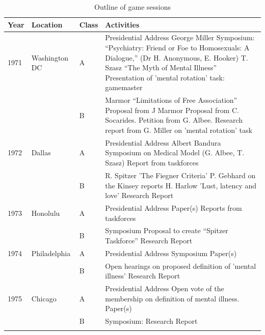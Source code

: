  \begin{longtable}[!t]{ | p{1cm} | p{2cm} | p{1cm} |  p{10cm} | }
\hline

\textbf{Year}&\textbf{Location}&\textbf{Class}&\textbf{Activities} \\ \hline
1971&Washington DC&A&Presidential Address\: George Miller \newline
Symposium: “Psychiatry: Friend or Foe to Homosexuals: A Dialogue,” (Dr H. Anonymous, E. Hooker)\newline
T. Szasz “The Myth of Mental Illness”\newline
Presentation of 'mental rotation' task: gamemaster\\

&&B&

Marmor “Limitations of Free Association”\newline
Proposal from J Marmor\newline
Proposal from C. Socarides.\newline
Petition from G. Albee.\newline
Research report from G. Miller on 'mental rotation' task\\
1972&Dallas&A&Presidential Address\: Albert Bandura\newline
Symposium on Medical Model (G. Albee, T. Szasz)\newline
Report from taskforces\\
&&B&
R. Spitzer 'The Fiegner Criteria'\newline
P. Gebhard on the Kinsey reports\newline
H. Harlow 'Lust, latency and love'\newline
Research Report\\
1973&Honolulu&A&
Presidential Address\: \newline
Paper(s) \newline
Reports from taskforces\\
&&B&
Symposium\:\newline
Proposal to create “Spitzer Taskforce”\newline
Research Report\\
1974&Philadelphia&A
&Presidential Address\:\newline
Symposium\:\newline
Paper(s)\\
&&B&
Open hearings on proposed definition of 'mental illness'\newline
Research Report\\
1975&Chicago&A&
Presidential Address\:\newline
Open vote of the membership on definition of mental illness.\newline
Paper(s)\\
&&B&
Symposium:\newline
Research Report\\
\hline

\caption{Outline of game sessions}
\label{table: outlineGameSessions}
\end{longtable}

